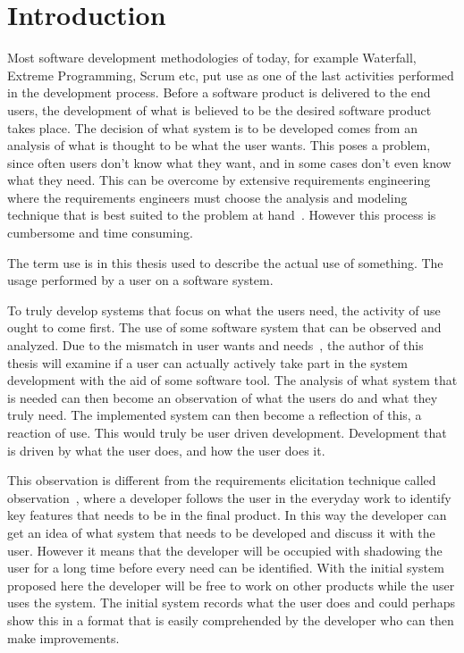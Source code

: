 \documentclass[a4paper]{report}
\begin{document}
\newpage
\tableofcontents

\chapter{Introduction}
Most software development methodologies of today, for example Waterfall, Extreme Programming, Scrum etc, put use as one of the last activities performed in the development process. Before a software product is delivered to the end users, the development of what is believed to be the desired software product takes place. The decision of what system is to be developed comes from an analysis of what is thought to be what the user wants. This poses a problem, since often users don't know what they want, and in some cases don't even know what they need. This can be overcome by extensive requirements engineering where the requirements engineers must choose the analysis and modeling technique that is best suited to the problem at hand~\cite{Zowghi-Paryani:2003}. However this process is cumbersome and time consuming.

The term use is in this thesis used to describe the actual use of something. The usage performed by a user on a software system. 

To truly develop systems that focus on what the users need, the activity of use ought to come first. The use of some software system that can be observed and analyzed. Due to the mismatch in user wants and needs~\cite{Kujala:2002}, the author of this thesis will examine if a user can actually actively take part in the system development with the aid of some software tool. The analysis of what system that is needed can then become an observation of what the users do and what they truly need. The implemented system can then become a reflection of this, a reaction of use. This would truly be user driven development. Development that is driven by what the user does, and how the user does it.

This observation is different from the requirements elicitation technique called observation~\cite{Lauesen:2002}, where a developer follows the user in the everyday work to identify key features that needs to be in the final product. In this way the developer can get an idea of what system that needs to be developed and discuss it with the user. However it means that the developer will be occupied with shadowing the user for a long time before every need can be identified. With the initial system proposed here the developer will be free to work on other products while the user uses the system. The initial system records what the user does and could perhaps show this in a format that is easily comprehended by the developer who can then make improvements.
\end{document}
